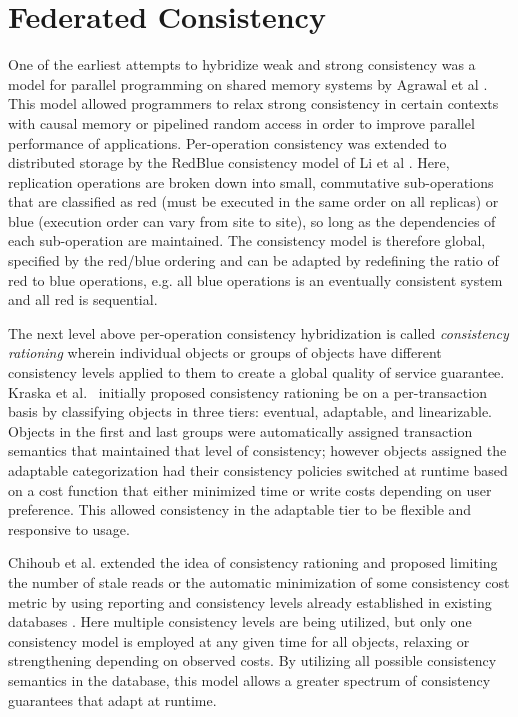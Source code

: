 \section{Federated Consistency}

One of the earliest attempts to hybridize weak and strong consistency was a
model for parallel programming on shared memory systems by Agrawal et al
\cite{hybrid_consistency}.
This model allowed programmers to relax strong consistency in certain contexts
with causal memory or pipelined random access in order to improve parallel
performance of applications.
Per-operation consistency was extended to distributed storage by the RedBlue
consistency model of Li et al \cite{redblue}.
Here, replication operations are broken down into small, commutative
sub-operations that are classified as red (must be executed in the same order
on all replicas) or blue (execution order can vary from site to site), so long
as the dependencies of each sub-operation are maintained.
The consistency model is therefore global, specified by the red/blue ordering
and can be adapted by redefining the ratio of red to blue operations, e.g.
all blue operations is an eventually consistent system and all red is
sequential.

The next level above per-operation consistency hybridization is called
\textit{consistency rationing} wherein individual objects or groups of objects
have different consistency levels applied to them to create a global quality
of service guarantee.
Kraska et al.~\cite{consistency_rationing} initially proposed consistency rationing be on a per-transaction basis by classifying objects in three tiers: eventual, adaptable, and linearizable.
Objects in the first and last groups were automatically assigned transaction
semantics that maintained that level of consistency; however objects assigned
the adaptable categorization had their consistency policies switched at
runtime based on a cost function that either minimized time or write costs
depending on user preference.
This allowed consistency in the adaptable tier to be flexible and responsive
to usage.

Chihoub et al.
extended the idea of consistency rationing and proposed limiting the number of
stale reads or the automatic minimization of some consistency cost metric by
using reporting and consistency levels already established in existing
databases \cite{harmony,harmony_money}.
Here multiple consistency levels are being utilized, but only one consistency
model is employed at any given time for all objects, relaxing or strengthening
depending on observed costs.
By utilizing all possible consistency semantics in the database, this model
allows a greater spectrum of consistency guarantees that adapt at runtime.

